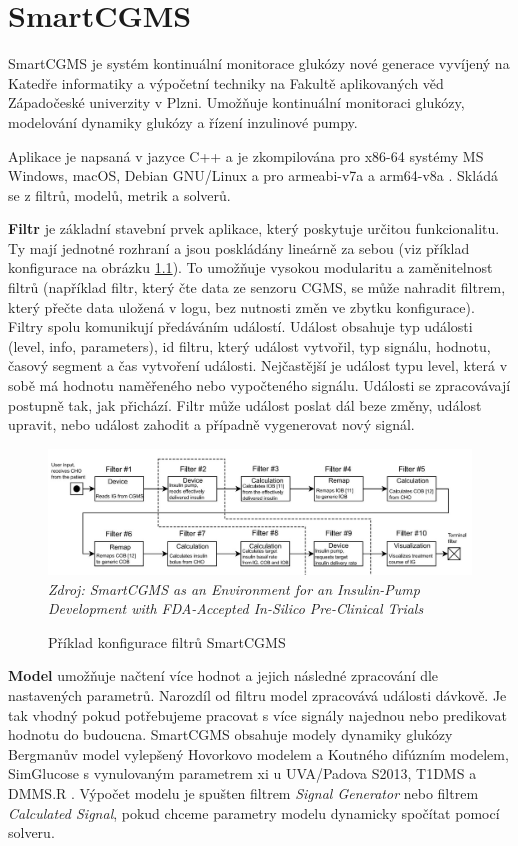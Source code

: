 \chapter{SmartCGMS}

SmartCGMS je systém kontinuální monitorace glukózy nové generace vyvíjený na Katedře informatiky a výpočetní techniky na Fakultě aplikovaných věd Západočeské univerzity v Plzni. Umožňuje kontinuální monitoraci glukózy, modelování dynamiky glukózy a řízení inzulinové pumpy.

Aplikace je napsaná v jazyce C++ a je zkompilována pro x86-64 systémy MS Windows, macOS, Debian GNU/Linux a pro armeabi-v7a a arm64-v8a \citep{cgms.koutny}. Skládá se z filtrů, modelů, metrik a solverů.

\textbf{Filtr} je základní stavební prvek aplikace, který poskytuje určitou funkcionalitu. Ty mají jednotné rozhraní a jsou poskládány lineárně za sebou (viz příklad konfigurace na obrázku \ref{fig:scgms_filters}). To umožňuje vysokou modularitu a zaměnitelnost filtrů (například filtr, který čte data ze senzoru CGMS, se může nahradit filtrem, který přečte data uložená v logu, bez nutnosti změn ve zbytku konfigurace). Filtry spolu komunikují předáváním událostí. Událost obsahuje typ události (level, info, parameters), id filtru, který událost vytvořil, typ signálu, hodnotu, časový segment a čas vytvoření události. Nejčastější je událost typu level, která v sobě má hodnotu naměřeného nebo vypočteného signálu. Události se zpracovávají postupně tak, jak přichází. Filtr může událost poslat dál beze změny, událost upravit, nebo událost zahodit a případně vygenerovat nový signál.

\begin{figure}[H]
\caption{Příklad konfigurace filtrů SmartCGMS}
\label{fig:scgms_filters}
\centering
\includegraphics[width=1\textwidth]{img/scgms/filters.jpg}
\textit{Zdroj: SmartCGMS as an Environment for an Insulin-Pump  Development with FDA-Accepted In-Silico Pre-Clinical Trials \citep{cgms.ubl}}
\end{figure}

\textbf{Model} umožňuje načtení více hodnot a jejich následné zpracování dle nastavených parametrů. Narozdíl od filtru model zpracovává události dávkově. Je tak vhodný pokud potřebujeme pracovat s více signály najednou nebo predikovat hodnotu do budoucna. SmartCGMS obsahuje modely dynamiky glukózy Bergmanův model vylepšený Hovorkovo modelem a Koutného difúzním modelem, SimGlucose s vynulovaným parametrem xi u UVA/Padova S2013, T1DMS a DMMS.R \citep{cgms.web}. Výpočet modelu je spušten filtrem \textit{Signal Generator} nebo filtrem \textit{Calculated Signal}, pokud chceme  parametry modelu dynamicky spočítat pomocí solveru.

